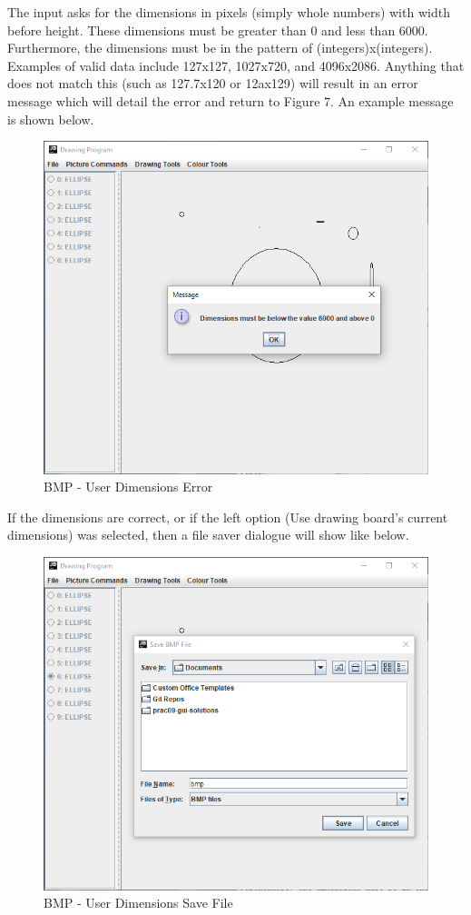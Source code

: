 \documentclass[12pt]{article} %
\begin{document}
The input asks for the dimensions in pixels (simply whole numbers) with width before height. These dimensions must be greater than 0 and less than 6000. Furthermore, the dimensions must be in the pattern of (integers)x(integers). Examples of valid data include 127x127, 1027x720, and 4096x2086. Anything that does not match this (such as 127.7x120 or 12ax129) will result in an error message which will detail the error and return to Figure 7. An example message is shown below.

\begin{figure}[H]
\caption{BMP - User Dimensions Error}
\centering
\includegraphics[scale=0.75]{pictures/bmpThirdWindow.PNG}
\end{figure}

If the dimensions are correct, or if the left option (Use drawing board's current dimensions) was selected, then a file saver dialogue will show like below.

\begin{figure}[H]
\caption{BMP - User Dimensions Save File}
\centering
\includegraphics[scale=0.75]{pictures/bmpFourthWindow.PNG}
\end{figure}
\end{document}
